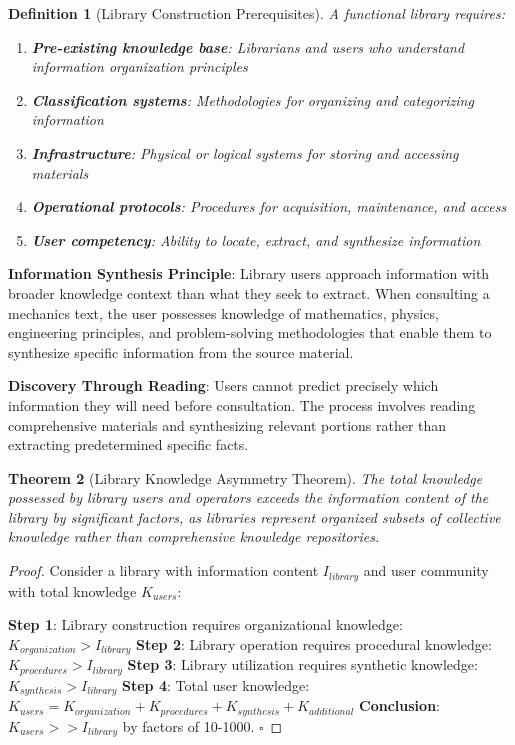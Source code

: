 \documentclass[12pt,a4paper]{article}
\newtheorem{theorem}{Theorem}[section]
\newtheorem{definition}[theorem]{Definition}
\begin{document}
\begin{definition}[Library Construction Prerequisites]
A functional library requires:
\begin{enumerate}
\item \textbf{Pre-existing knowledge base}: Librarians and users who understand information organization principles
\item \textbf{Classification systems}: Methodologies for organizing and categorizing information
\item \textbf{Infrastructure}: Physical or logical systems for storing and accessing materials
\item \textbf{Operational protocols}: Procedures for acquisition, maintenance, and access
\item \textbf{User competency}: Ability to locate, extract, and synthesize information
\end{enumerate}
\end{definition}

\textbf{Information Synthesis Principle}: Library users approach information with broader knowledge context than what they seek to extract. When consulting a mechanics text, the user possesses knowledge of mathematics, physics, engineering principles, and problem-solving methodologies that enable them to synthesize specific information from the source material.

\textbf{Discovery Through Reading}: Users cannot predict precisely which information they will need before consultation. The process involves reading comprehensive materials and synthesizing relevant portions rather than extracting predetermined specific facts.

\begin{theorem}[Library Knowledge Asymmetry Theorem]
The total knowledge possessed by library users and operators exceeds the information content of the library by significant factors, as libraries represent organized subsets of collective knowledge rather than comprehensive knowledge repositories.
\end{theorem}

\begin{proof}
Consider a library with information content $I_{library}$ and user community with total knowledge $K_{users}$:

\textbf{Step 1}: Library construction requires organizational knowledge: $K_{organization} > I_{library}$
\textbf{Step 2}: Library operation requires procedural knowledge: $K_{procedures} > I_{library}$  
\textbf{Step 3}: Library utilization requires synthetic knowledge: $K_{synthesis} > I_{library}$
\textbf{Step 4}: Total user knowledge: $K_{users} = K_{organization} + K_{procedures} + K_{synthesis} + K_{additional}$
\textbf{Conclusion}: $K_{users} >> I_{library}$ by factors of 10-1000. $\square$
\end{proof}
\end{document}
